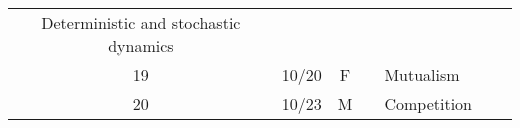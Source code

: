 \documentclass[]{article}
\begin{document}
\begin{longtable}[]{@{}cccllll@{}}
\begin{minipage}[t]{0.11\columnwidth}
Deterministic and stochastic dynamics\strut
\end{minipage} & \begin{minipage}[t]{0.11\columnwidth}\raggedright\strut
\strut
\end{minipage} & \begin{minipage}[t]{0.16\columnwidth}\raggedright\strut
\strut
\end{minipage}\tabularnewline
\begin{minipage}[t]{0.12\columnwidth}\centering\strut
19\strut
\end{minipage} & \begin{minipage}[t]{0.08\columnwidth}\centering\strut
10/20\strut
\end{minipage} & \begin{minipage}[t]{0.07\columnwidth}\centering\strut
F\strut
\end{minipage} & \begin{minipage}[t]{0.10\columnwidth}\raggedright\strut
\strut
\end{minipage} & \begin{minipage}[t]{0.11\columnwidth}\raggedright\strut
Mutualism\strut
\end{minipage} & \begin{minipage}[t]{0.11\columnwidth}\raggedright\strut
\strut
\end{minipage} & \begin{minipage}[t]{0.16\columnwidth}\raggedright\strut
\strut
\end{minipage}\tabularnewline
\begin{minipage}[t]{0.12\columnwidth}\centering\strut
20\strut
\end{minipage} & \begin{minipage}[t]{0.08\columnwidth}\centering\strut
10/23\strut
\end{minipage} & \begin{minipage}[t]{0.07\columnwidth}\centering\strut
M\strut
\end{minipage} & \begin{minipage}[t]{0.10\columnwidth}\raggedright\strut
\strut
\end{minipage} & \begin{minipage}[t]{0.11\columnwidth}\raggedright\strut
Competition\strut
\end{minipage} & \begin{minipage}[t]{0.11\columnwidth}\raggedright\strut
\strut
\end{minipage} & \begin{minipage}[t]{0.16\columnwidth}\raggedright\strut

\end{minipage}
\end{longtable}
\end{document}
